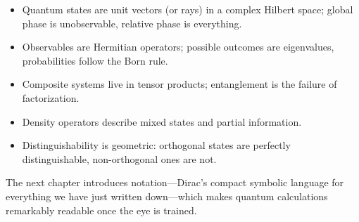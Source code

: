 \begin{itemize}
  \item Quantum states are unit vectors (or rays) in a complex Hilbert space; global phase is unobservable, relative phase is everything.
  \item Observables are Hermitian operators; possible outcomes are eigenvalues, probabilities follow the Born rule.
  \item Composite systems live in tensor products; entanglement is the failure of factorization.
  \item Density operators describe mixed states and partial information.
  \item Distinguishability is geometric: orthogonal states are perfectly distinguishable, non-orthogonal ones are not.
\end{itemize}

The next chapter introduces  notation---Dirac's compact symbolic language for everything we have just written down---which makes quantum calculations remarkably readable once the eye is trained.

\textsep

